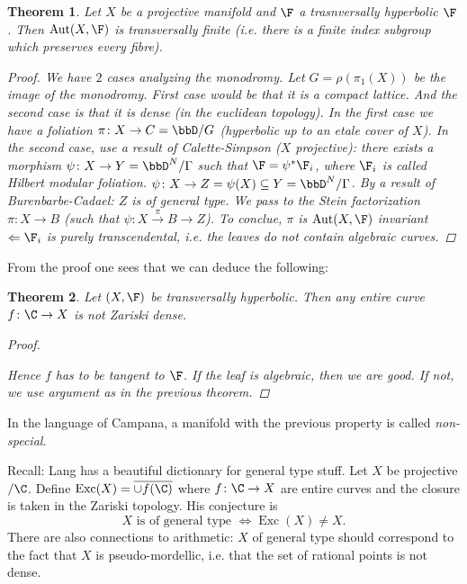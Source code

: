 \documentclass[A4paper, british]{amsart}
\theoremstyle{darkgreentheorem}
\newtheorem{thm}{Theorem}[section]
\theoremstyle{darkbluedefinition}
\theoremstyle{darkredexample}
\theoremstyle{remark}
\DeclareMathOperator{\Aut}{Aut}
\DeclareMathOperator{\Exc}{Exc}
\newcommand{\1}{\mathbbm{1}}
\newcommand{\sub}{\subseteq}
\begin{document}
\begin{thm}
    Let $X$ be a projective manifold and $\F$ a trasnversally hyperbolic $\F$.
    Then $\Aut(X,\F)$ is transversally finite (i.e. there is a finite index subgroup which preserves every fibre).
    \begin{proof}
	We have $2$ cases analyzing the monodromy.
	Let $G=\rho(\pi_{1}(X))$ be the image of the monodromy.
	First case would be that it is a compact lattice.
	And the second case is that it is dense (in the euclidean topology).
	In the first case we have a foliation $\pi\colon X\to C=\bbD/G$ (hyperbolic up to an etale cover of $X$).
	In the second case, use a result of Calette-Simpson ($X$ projective): there exists a morphism $\psi\colon X\to Y=\bbD^{N}/\Gamma$ such that $\F=\psi^{*}\F_{i}$, where $\F_{i}$ is called Hilbert modular foliation.
	$\psi \colon X\to Z=\psi(X)\sub Y=\bbD^{N}/\Gamma$.
	By a result of Burenbarbe-Cadael: $Z$ is of general type.
	We pass to the Stein factorization $\pi \colon X\to B$ (such that $\psi\colon X\xrightarrow{\pi}B\to Z$).
	To conclue, $\pi$ is $\Aut(X,\F)$ invariant $\Leftarrow \F_{i}$ is purely transcendental, i.e. the leaves do not contain algebraic curves.
    \end{proof}
\end{thm}

From the proof one sees that we can deduce the following:

\begin{thm}
    Let $(X,\F)$ be transversally hyperbolic.
    Then any entire curve $f\colon \C\to X$ is not Zariski dense.
    \begin{proof}
	\begin{center}
	\end{center}
	Hence $f$ has to be tangent to $\F$.
	If the leaf is algebraic, then we are good.
	If not, we use argument as in the previous theorem.
    \end{proof}
\end{thm}

In the language of Campana, a manifold with the previous property is called \textit{non-special}.

Recall: Lang has a beautiful dictionary for general type stuff.
Let $X$ be projective $/\C$.
Define $\Exc(X)=\overline{\cup f(\C)}$ where $f\colon \C\to X$ are entire curves and the closure is taken in the Zariski topology.
His conjecture is
\[ X \text{ is of general type } \Leftrightarrow \Exc(X)\neq X.\]
There are also connections to arithmetic: $X$ of general type should correspond to the fact that $X$ is pseudo-mordellic, i.e. that the set of rational points is not dense.
\end{document}
